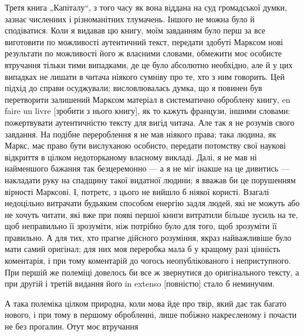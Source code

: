 
Третя книга „Капіталу“, з того часу як вона віддана на суд громадської думки, зазнає численних і
різноманітних тлумачень. Іншого не можна було й сподіватися. Коли я видавав цю книгу, моїм
завданням було перш за все виготовити по можливості аутентичний текст, передати здобуті Марксом
нові результати по можливості його ж власними словами, обмежити моє особисте втручання тільки тими випадками, де це
було абсолютно необхідно, але й у цих випадках не лишати в читача ніякого
сумніву про те, хто з ним говорить. Цей підхід до справи осуджували; висловлювалась думка, що я
повинен був перетворити залишений Марксом матеріал в систематично оброблену книгу, en faire un
livre [зробити з нього книгу], як то кажуть французи, іншими словами: пожертвувати аутентичністю
тексту для вигід читача. Але так я не розумів свого завдання. На подібне перероблення я не мав
ніякого права; така людина, як Маркс, має право бути вислуханою особисто, передати потомству
свої наукові відкриття в цілком недоторканому власному викладі. Далі, я не мав ні найменшого
бажання так безцеремонно — а я не міг інакше на це дивитись — накладати руку на спадщину такої видатної людини; я вважав би це порушенням вірності Марксові. І, потретє, з цього не вийшло б
ніякої користі. Взагалі недоцільно витрачати будьяким способом енергію задля людей, які не можуть або не хочуть читати, які вже при появі першої книги витратили більше зусиль на те, щоб
неправильно її зрозуміти, ніж потрібно було для того, щоб зрозуміти її правильно. А для тих, хто
прагне дійсного розуміння, якраз найважливіше було мати самий оригінал; для них моя переробка
мала б у кращому разі цінність коментарія, і при тому коментарій до чогось неопублікованого і
неприступного. При першій же полеміці довелось би все ж звернутися до оригінального тексту, а
при другій і третій видання його in extenso [повністю] стало б неминучим.

А така полеміка цілком
природна, коли мова йде про твір, який дає так багато нового, і при тому в першому обробленні,
лише побіжно накресленому і почасти не без прогалин. Отут моє втручання
\parbreak{}  %
